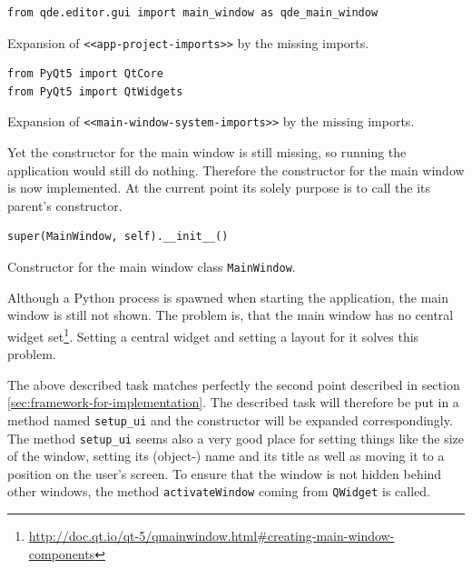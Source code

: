 \documentclass[10pt, openright, notitlepage]{scrreprt}
\begin{document}
\begin{listing}[H]
\begin{verbatim}
from qde.editor.gui import main_window as qde_main_window
\end{verbatim}
\caption{\label{app-project-imports}
Expansion of \texttt{<<app-project-imports>>} by the missing imports.}
\end{listing}

\begin{listing}[H]
\begin{verbatim}
from PyQt5 import QtCore
from PyQt5 import QtWidgets
\end{verbatim}
\caption{\label{main-window-system-imports}
Expansion of \texttt{<<main-window-system-imports>>} by the missing imports.}
\end{listing}

Yet the constructor for the main window is still missing, so running the
application would still do nothing. Therefore the constructor for the main
window is now implemented. At the current point its solely purpose is to call
the its parent's constructor.

\begin{listing}[H]
\begin{verbatim}
super(MainWindow, self).__init__()
\end{verbatim}
\caption{\label{main-window-constructor}
Constructor for the main window class \texttt{MainWindow}.}
\end{listing}

Although a Python process is spawned when starting the application, the main
window is still not shown. The problem is, that the main window has no central
widget
set\footnote{\url{http://doc.qt.io/qt-5/qmainwindow.html\#creating-main-window-components}}.
Setting a central widget and setting a layout for it solves this problem.

The above described task matches perfectly the second point described in section
\ref{sec:framework-for-implementation}. The described task will therefore be put in a
method named \texttt{setup\_ui} and the constructor will be expanded correspondingly.
The method \texttt{setup\_ui} seems also a very good place for setting things like the
size of the window, setting its (object-) name and its title as well as moving
it to a position on the user's screen. To ensure that the window is not hidden
behind other windows, the method \texttt{activateWindow} coming from \texttt{QWidget} is
called.
\end{document}

